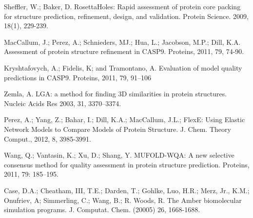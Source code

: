 \documentclass[12pt]{article}
\begin{document}
\begin{thebibliography}{99}
Sheffler, W.; Baker, D. RosettaHoles: Rapid assessment of protein core packing for structure prediction, refinement, design, and validation. Protein Science. 2009, 18(1), 229-239.


MacCallum, J.; Perez, A.; Schnieders, MJ.; Hua, L.; Jacobson, M.P.; Dill, K.A. Assessment of protein structure refinement 
in CASP9. Proteins, 2011, 79, 74-90.

Kryshtafovych, A.; Fidelis, K; and Tramontano, A. Evaluation of model quality predictions in CASP9. Proteins, 2011, 79, 91–106

Zemla, A. LGA: a method for finding 3D similarities in protein structures. Nucleic Acids Res 2003, 31, 3370–3374.


Perez, A.; Yang, Z.; Bahar, I.; Dill, K.A.; MacCallum, J.L.; FlexE: Using Elastic Network Models to Compare Models of Protein Structure. J. Chem. Theory Comput., 2012, 8, 3985-3991. 

Wang, Q.; Vantasin, K.; Xu, D.; Shang, Y. MUFOLD-WQA: A new selective consensus method for quality assessment in protein structure prediction. 
Proteins, 2011, 79: 185–195. 

Case, D.A.; Cheatham, III, T.E.; Darden, T.; Gohlke, Luo, H.R.; Merz, Jr., K.M.;  Onufriev, A; Simmerling, C.; 
Wang, B.; R. Woods, R. The Amber biomolecular simulation programs. J. Computat. Chem. (20005) 26, 1668-1688.



\end{thebibliography}
\end{document}
